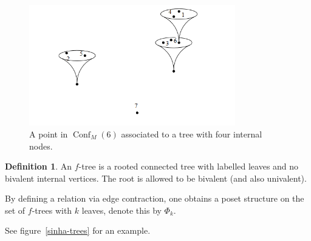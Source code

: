 \documentclass{scrartcl}
\theoremstyle{plain}
\theoremstyle{definition}
\newtheorem{definition}[theorem]{Definition}
\DeclareMathOperator{\Conf}{Conf}
\begin{document}
\begin{figure}[ht]\label{sinha-fm}
    \centering
    \includegraphics[width=0.8\textwidth]{img/sinha-fm-element}
    \caption{A point in $\Conf_M(6)$ associated to a tree with four internal nodes. }
\end{figure}    

\begin{definition}
    An $f$-tree is a rooted connected tree with labelled leaves and no bivalent internal vertices. The root is allowed to be bivalent (and also univalent).
    
    By defining a relation via edge contraction, one obtains a poset structure on the set of $f$-trees with $k$ leaves, denote this by $\Phi_k$.
\end{definition}
See figure~\ref{sinha-trees} for an example.
\end{document}
